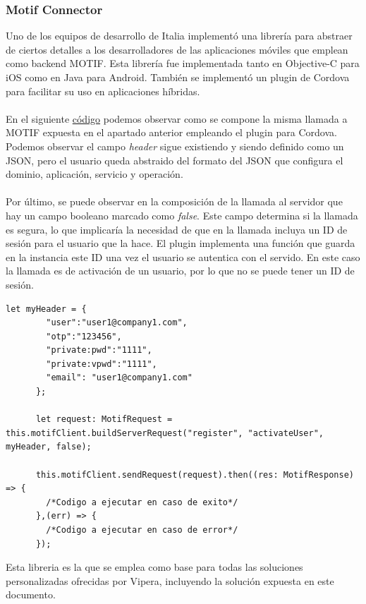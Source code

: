 \documentclass[a4paper, 12pt]{article}
\newenvironment{code}{\captionsetup{type=listing}}{}
\begin{document}
\subsubsection{Motif Connector}
\label{sec-2-3-2}
Uno de los equipos de desarrollo de Italia implementó una librería para abstraer de ciertos detalles a los desarrolladores
de las aplicaciones móviles que emplean como backend MOTIF. Esta librería fue implementada tanto en Objective-C para iOS
como en Java para Android. También se implementó un plugin de Cordova para facilitar su uso en aplicaciones híbridas.
\\
\\
En el siguiente \hyperref[code:motifconnector]{código} podemos observar como se compone la misma llamada a MOTIF expuesta en
el apartado anterior empleando el plugin para Cordova. Podemos observar el campo \emph{header} sigue existiendo y siendo definido
como un JSON, pero el usuario queda abstraido del formato del JSON que configura el dominio, aplicación, servicio y operación.
\\
\\
Por último, se puede observar en la composición de la llamada al servidor que hay un campo booleano marcado como \emph{false}. Este
campo determina si la llamada es segura, lo que implicaría la necesidad de que en la llamada incluya un ID de sesión para el
usuario que la hace. El plugin implementa una función que guarda en la instancia este ID una vez el usuario se autentica con el
servido. En este caso la llamada es de activación de un usuario, por lo que no se puede tener un ID de sesión.
\begin{code}
\label{code:motifconnector}
\begin{verbatim}
let myHeader = {
        "user":"user1@company1.com",
        "otp":"123456",
        "private:pwd":"1111",
        "private:vpwd":"1111",
        "email": "user1@company1.com"
      };

      let request: MotifRequest = this.motifClient.buildServerRequest("register", "activateUser", myHeader, false);

      this.motifClient.sendRequest(request).then((res: MotifResponse) => {
        /*Codigo a ejecutar en caso de exito*/
      },(err) => {
        /*Codigo a ejecutar en caso de error*/
      });
\end{verbatim}
\end{code}
\bigbreak
Esta libreria es la que se emplea como base para todas las soluciones personalizadas ofrecidas por Vipera, incluyendo la solución
expuesta en este documento.
\end{document}
